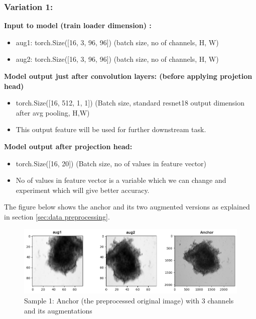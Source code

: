\subsubsection{Variation 1:}
\textbf{Input to model (train loader dimension) :} 

\begin{itemize}
  \item aug1: torch.Size([16, 3, 96, 96])        (batch size, no of channels, H, W)
  \item aug2: torch.Size([16, 3, 96, 96])        (batch size, no of channels, H, W) \vspace{1em}
\end{itemize} \vspace{1em}
\textbf{Model output just after convolution layers: (before applying projetion head)} 
\begin{itemize}
  \item torch.Size([16, 512, 1, 1]) (Batch size, standard resnet18 output dimension after avg pooling, H,W)   
  \item This output feature will be used for further downstream task.  \vspace{1em}
\end{itemize}

\textbf{Model output after projection head:}
\begin{itemize}
  \item torch.Size([16, 20])  (Batch size, no of values in feature vector)  
  \item No of values in feature vector is a variable which we can change and experiment which will give better accuracy.
\end{itemize}

The figure below shows the anchor and its two augmented versions as explained in section \ref{sec:data preprocessing}.

\begin{figure}[H]
  \centering
  \includegraphics[width=0.9\linewidth]{figures/3_1.png} %
  \caption{Sample 1: Anchor (the preprocessed original image) with 3 channels and its augmentations}
  \label{fig:augmentation}
\end{figure}



